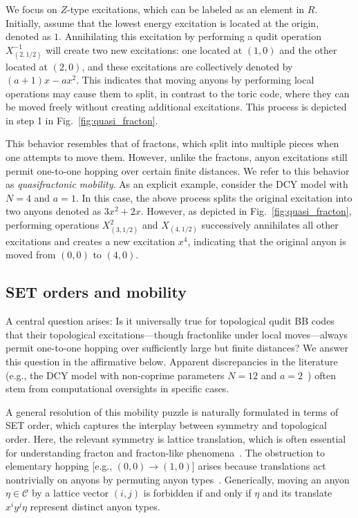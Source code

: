 \documentclass[aps,prb,english,superscriptaddress,twocolumn,tightenlines,showpacs,longbibliography,floatfix,amsfonts]{revtex4-2}
\begin{document}
We focus on $Z$-type excitations, which can be labeled as an element in $R$. Initially, assume that the lowest energy excitation is located at the origin, denoted as $1$. Annihilating this excitation by performing a qudit operation $X_{(2,{1}/{2})}^{-1}$ will create two new excitations: one located at $(1,0)$ and the other located at $(2,0)$, and these excitations are collectively denoted by $(a+1)x-ax^2$. This indicates that moving anyons by performing local operations may cause them to split, in contrast to the toric code, where they can be moved freely without creating additional excitations. This process is depicted in step 1 in Fig.~\ref{fig:quasi_fracton}.
  
This behavior resembles that of fractons, which split into multiple pieces when one attempts to move them. However, unlike the fractons, anyon excitations still permit one-to-one hopping over certain finite distances. We refer to this behavior as \textit{quasifractonic mobility}. As an explicit example, consider the DCY model with $N=4$ and $a=1$. In this case, the above process splits the original excitation into two anyons denoted as $3x^2+2x$. However, as depicted in Fig.~\ref{fig:quasi_fracton}, performing operations $X_{(3,{1}/{2})}^{2}$ and $X_{(4,{1}/{2})}$ successively annihilates all other excitations and creates a new excitation $x^4$, indicating that the original anyon is moved from $(0,0)$ to $(4,0)$. 


\subsection{SET orders and mobility}
\label{sec5b}

A central question arises: Is it universally true for topological qudit BB codes that their topological excitations---though fractonlike under local moves---always permit one-to-one hopping over sufficiently large but finite distances? We answer this question in the affirmative below. Apparent discrepancies in the literature (e.g., the DCY model with non-coprime parameters $N=12$ and $a=2$~\cite{Delfino2023_2}) often stem from computational oversights in specific cases.

A general resolution of this mobility puzzle is naturally formulated in terms of SET order, which captures the interplay between symmetry and topological order. Here, the relevant symmetry is lattice translation, which is often essential for understanding fracton and fracton-like phenomena~\cite{Williamson2018, Pai2019, Dua2019}. The obstruction to elementary hopping [e.g., $(0,0)\to(1,0)$] arises because translations act nontrivially on anyons by permuting anyon types~\cite{Barkeshli2019, Chen2025}. 
Generically, moving an anyon $\eta\in\mathcal{C}$ by a lattice vector $(i,j)$ is forbidden if and only if $\eta$ and its translate $x^i y^j \eta$ represent distinct anyon types.
\end{document}
